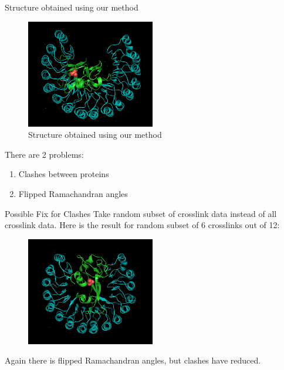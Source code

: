 \begin{frame}{Structure obtained using our method}
    \begin{figure}
        \centering
        \includegraphics[width=0.5\textwidth]{images/1dfj_2.png}
        \caption{Structure obtained using our method}
        \label{fig:my_label}
    \end{figure}

    \pause

    There are 2 problems:
    \begin{enumerate}
        \item Clashes between proteins
        \item Flipped Ramachandran angles
    \end{enumerate}
\end{frame}

\begin{frame}{Possible Fix for Clashes}
    Take random subset of crosslink data instead of all crosslink data. Here is the result for random subset of 6 crosslinks out of 12:

    \begin{figure}
        \centering
        \includegraphics[width=0.5\textwidth]{images/1dfj_3.png}
    \end{figure}
    
    Again there is flipped Ramachandran angles, but clashes have reduced.
\end{frame}


